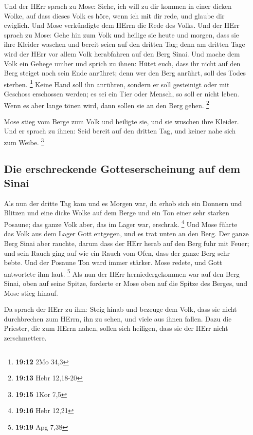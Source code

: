  Und der HErr sprach zu Mose: Siehe, ich will zu dir
kommen in einer dicken Wolke, auf dass dieses Volk es höre, wenn ich mit
dir rede, und glaube dir ewiglich. Und Mose verkündigte dem HErrn die
Rede des Volks.  Und der HErr sprach zu Mose: Gehe hin
zum Volk und heilige sie heute und morgen, dass sie ihre Kleider waschen
 und bereit seien auf den dritten Tag; denn am dritten
Tage wird der HErr vor allem Volk herabfahren auf den Berg Sinai.
 Und mache dem Volk ein Gehege umher und sprich zu ihnen:
Hütet euch, dass ihr nicht auf den Berg steiget noch sein Ende anrühret;
denn wer den Berg anrührt, soll des Todes sterben. \footnote{\textbf{19:12}
  2Mo 34,3}  Keine Hand soll ihn anrühren, sondern er
soll gesteinigt oder mit Geschoss erschossen werden; es sei ein Tier
oder Mensch, so soll er nicht leben. Wenn es aber lange tönen wird, dann
sollen sie an den Berg gehen. \footnote{\textbf{19:13} Hebr 12,18-20}

 Mose stieg vom Berge zum Volk und heiligte sie, und sie
wuschen ihre Kleider.  Und er sprach zu ihnen: Seid
bereit auf den dritten Tag, und keiner nahe sich zum Weibe. \footnote{\textbf{19:15}
  1Kor 7,5}

\hypertarget{die-erschreckende-gotteserscheinung-auf-dem-sinai}{%
\subsection{Die erschreckende Gotteserscheinung auf dem
Sinai}\label{die-erschreckende-gotteserscheinung-auf-dem-sinai}}

 Als nun der dritte Tag kam und es Morgen war, da erhob
sich ein Donnern und Blitzen und eine dicke Wolke auf dem Berge und ein
Ton einer sehr starken Posaune; das ganze Volk aber, das im Lager war,
erschrak. \footnote{\textbf{19:16} Hebr 12,21}  Und Mose
führte das Volk aus dem Lager Gott entgegen, und es trat unten an den
Berg.  Der ganze Berg Sinai aber rauchte, darum dass der
HErr herab auf den Berg fuhr mit Feuer; und sein Rauch ging auf wie ein
Rauch vom Ofen, dass der ganze Berg sehr bebte.  Und der
Posaune Ton ward immer stärker. Mose redete, und Gott antwortete ihm
laut. \footnote{\textbf{19:19} Apg 7,38}  Als nun der
HErr herniedergekommen war auf den Berg Sinai, oben auf seine Spitze,
forderte er Mose oben auf die Spitze des Berges, und Mose stieg hinauf.

 Da sprach der HErr zu ihm: Steig hinab und bezeuge dem
Volk, dass sie nicht durchbrechen zum HErrn, ihn zu sehen, und viele aus
ihnen fallen.  Dazu die Priester, die zum HErrn nahen,
sollen sich heiligen, dass sie der HErr nicht zerschmettere.

